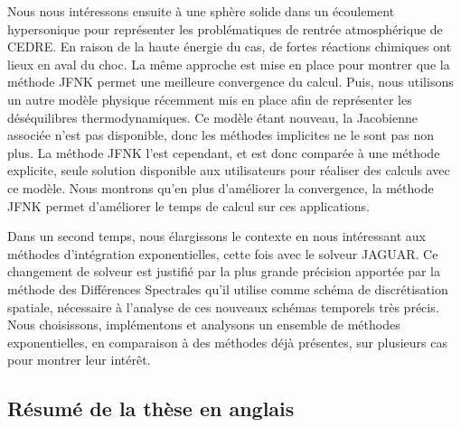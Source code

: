 Nous nous intéressons ensuite à une sphère solide dans un écoulement hypersonique pour représenter les problématiques de rentrée atmosphérique de CEDRE.
En raison de la haute énergie du cas, de fortes réactions chimiques ont lieux en aval du choc.
La même approche est mise en place pour montrer que la méthode JFNK permet une meilleure convergence du calcul.
Puis, nous utilisons un autre modèle physique récemment mis en place afin de représenter les déséquilibres thermodynamiques.
Ce modèle étant nouveau, la Jacobienne associée n'est pas disponible, donc les méthodes implicites ne le sont pas non plus.
La méthode JFNK l'est cependant, et est donc comparée à une méthode explicite, seule solution disponible aux utilisateurs pour réaliser des calculs avec ce modèle.
Nous montrons qu'en plus d'améliorer la convergence, la méthode JFNK permet d'améliorer le temps de calcul sur ces applications.

Dans un second temps, nous élargissons le contexte en nous intéressant aux méthodes d'intégration exponentielles, cette fois avec le solveur JAGUAR.
Ce changement de solveur est justifié par la plus grande précision apportée par la méthode des Différences Spectrales qu'il utilise comme schéma de discrétisation spatiale, nécessaire à l'analyse de ces nouveaux schémas temporels très précis.
Nous choisissons, implémentons et analysons un ensemble de méthodes exponentielles, en comparaison à des méthodes déjà présentes, sur plusieurs cas pour montrer leur intérêt.


  \subsection{Résumé de la thèse en anglais}


